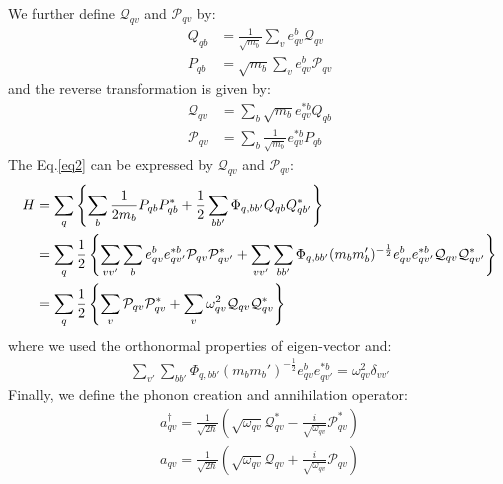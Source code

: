 \documentclass{article}
\begin{document}
We further define $\mathcal{Q}_{qv}$ and $\mathcal{P}_{qv}$ by:
\begin{align}
    Q_{qb} &= \frac{1}{\sqrt{m_b}} \sum_v e_{qv}^b \mathcal{Q}_{qv} \\
    P_{qb} &= \sqrt{m_b} \sum_v e_{qv}^b \mathcal{P}_{qv}
\end{align}
and the reverse transformation is given by:
\begin{align}
    \mathcal{Q}_{qv} &= \sum_b \sqrt{m_b} e_{qv}^{*b} Q_{qb} \\
    \mathcal{P}_{qv} &= \sum_b \frac{1}{\sqrt{m_b}} e_{qv}^{*b} P_{qb}
\end{align}
The Eq.\ref{eq2} can be expressed by $\mathcal{Q}_{qv}$ and $\mathcal{P}_{qv}$:
\begin{align}
    H &= \sum_{q} \left\{ \sum_{b} \frac{1}{2m_b} P_{qb} P_{qb}^* + \frac{1}{2} \sum_{bb'} \Phi_{q,bb'} Q_{qb} Q_{qb'}^* \right\} \notag \\
      &= \sum_{q} \frac{1}{2} 
      \left\{ \sum_{vv'} \sum_{b}e_{qv}^b e_{qv'}^{*b} \mathcal{P}_{qv} \mathcal{P}^*_{qv'} + \sum_{vv'} \sum_{bb'} \Phi_{q,bb'} (m_b m_b')^{-\frac{1}{2}} e_{qv}^b e_{qv'}^{*b} \mathcal{Q}_{qv} \mathcal{Q}^*_{qv'}\right\} \notag \\
      &= \sum_{q} \frac{1}{2} 
      \left\{ \sum_{v} \mathcal{P}_{qv} \mathcal{P}^*_{qv} + \sum_{v} \omega^2_{qv} \mathcal{Q}_{qv} \mathcal{Q}^*_{qv}\right\} \label{hamil}
\end{align}
where we used the orthonormal properties of eigen-vector and:
\begin{align}
    \sum_{v'} \sum_{bb'} \Phi_{q,bb'} (m_b m_b')^{-\frac{1}{2}} e_{qv}^b e_{qv'}^{*b} = \omega^2_{qv}\delta_{vv'}
\end{align}
Finally, we define the phonon creation and annihilation operator:
\begin{align}
    a^{\dagger}_{qv} = \frac{1}{\sqrt{2\hbar}} \left( \sqrt{\omega_{qv}} \mathcal{Q}^*_{qv} - \frac{i}{\sqrt{\omega_{qv}}}\mathcal{P}^*_{qv} \right) \\
    a_{qv} = \frac{1}{\sqrt{2\hbar}} \left( \sqrt{\omega_{qv}} \mathcal{Q}_{qv} + \frac{i}{\sqrt{\omega_{qv}}}\mathcal{P}_{qv} \right) \\
\end{align}
\end{document}
